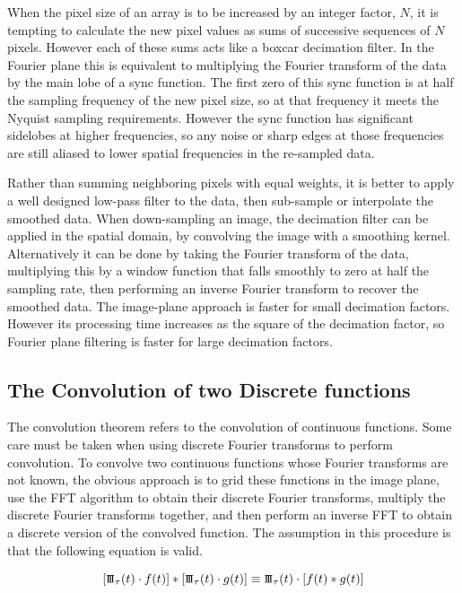 \documentclass[12pt,twoside,a4paper]{article}
\newcommand{\sha}{\mbox{\small I\!I\!I}}
\begin{document}
When the pixel size of an array is to be increased by an integer
factor, $N$, it is tempting to calculate the new pixel values as sums
of successive sequences of $N$ pixels.  However each of these sums
acts like a boxcar decimation filter.  In the Fourier plane this is
equivalent to multiplying the Fourier transform of the data by the
main lobe of a sync function. The first zero of this sync function is
at half the sampling frequency of the new pixel size, so at that
frequency it meets the Nyquist sampling requirements. However the sync
function has significant sidelobes at higher frequencies, so any noise
or sharp edges at those frequencies are still aliased to lower spatial
frequencies in the re-sampled data.

Rather than summing neighboring pixels with equal weights, it is
better to apply a well designed low-pass filter to the data, then
sub-sample or interpolate the smoothed data. When down-sampling an
image, the decimation filter can be applied in the spatial domain, by
convolving the image with a smoothing kernel. Alternatively it can be
done by taking the Fourier transform of the data, multiplying this by
a window function that falls smoothly to zero at half the sampling
rate, then performing an inverse Fourier transform to recover the
smoothed data. The image-plane approach is faster for small decimation
factors. However its processing time increases as the square of the
decimation factor, so Fourier plane filtering is faster for large
decimation factors.

\subsection{The Convolution of two Discrete functions}
\label{discrete_convolution}

The convolution theorem refers to the convolution of continuous
functions. Some care must be taken when using discrete Fourier
transforms to perform convolution.  To convolve two continuous
functions whose Fourier transforms are not known, the obvious approach
is to grid these functions in the image plane, use the FFT algorithm
to obtain their discrete Fourier transforms, multiply the discrete
Fourier transforms together, and then perform an inverse FFT to obtain
a discrete version of the convolved function. The assumption in this
procedure is that the following equation is valid.

\begin{equation}
\label{discrete_conv_eqn}
 [\sha_{\tau}(t) \cdot f(t)] \ast [\sha_{\tau}(t) \cdot g(t)] \equiv
 \sha_{\tau}(t) \cdot [f(t)\ast g(t)]
\end{equation}
\end{document}
